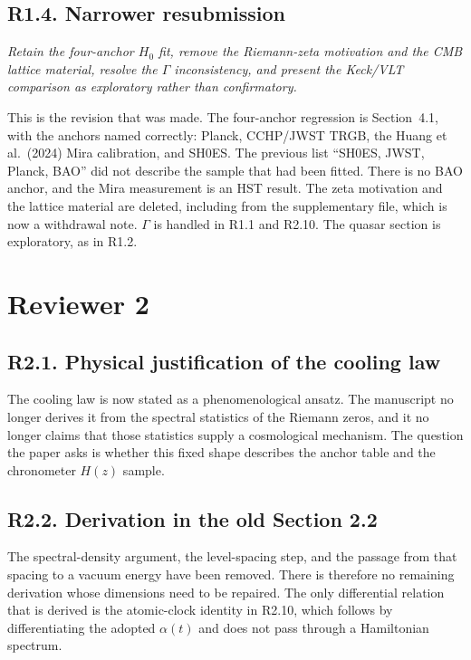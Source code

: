 \documentclass[11pt]{article}
\begin{document}
\subsection*{R1.4. Narrower resubmission}

\textit{Retain the four-anchor $H_{0}$ fit, remove the Riemann-zeta motivation and the CMB lattice material, resolve the $\Gamma$ inconsistency, and present the Keck/VLT comparison as exploratory rather than confirmatory.}

This is the revision that was made.
The four-anchor regression is Section~4.1, with the anchors named correctly: Planck, CCHP/JWST TRGB, the Huang et al.\ (2024) Mira calibration, and SH0ES.
The previous list ``SH0ES, JWST, Planck, BAO'' did not describe the sample that had been fitted.
There is no BAO anchor, and the Mira measurement is an HST result.
The zeta motivation and the lattice material are deleted, including from the supplementary file, which is now a withdrawal note.
$\Gamma$ is handled in R1.1 and R2.10.
The quasar section is exploratory, as in R1.2.

\section*{Reviewer 2}

\subsection*{R2.1. Physical justification of the cooling law}

The cooling law is now stated as a phenomenological ansatz.
The manuscript no longer derives it from the spectral statistics of the Riemann zeros, and it no longer claims that those statistics supply a cosmological mechanism.
The question the paper asks is whether this fixed shape describes the anchor table and the chronometer $H(z)$ sample.

\subsection*{R2.2. Derivation in the old Section 2.2}

The spectral-density argument, the level-spacing step, and the passage from that spacing to a vacuum energy have been removed.
There is therefore no remaining derivation whose dimensions need to be repaired.
The only differential relation that is derived is the atomic-clock identity in R2.10, which follows by differentiating the adopted $\alpha(t)$ and does not pass through a Hamiltonian spectrum.
\end{document}
